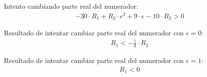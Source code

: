
Intento cambiando parte real del numerador:
\begin{align}
    &-30 \cdot R_1 + R_2 \cdot \epsilon^2 + 9 \cdot \epsilon - 10 \cdot R_2 > 0
    \label{eq:ej5_attempting_changing_zeros_with_real_part}
\end{align}

Resultado de intentar cambiar parte real del numerador con $\epsilon = 0$:
\begin{align}
    &R_1 < -\frac{1}{3} \cdot R_2
    \label{eq:ej5_results_of_attempting_changing_zeros_with_real_part_epsilon_0}
\end{align}

Resultado de intentar cambiar parte real del numerador con $\epsilon = 1$:
\begin{align}
    &R_1 < 0
    \label{eq:ej5_results_of_attempting_changing_zeros_with_real_part_epsilon_1}
\end{align}

